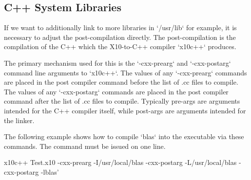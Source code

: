 \subsection{C++ System Libraries}

If we want to additionally link to more libraries in \xcd`/usr/lib` for
example, it is necessary to adjust the post-compilation directly.  The
post-compilation is the compilation of the C++ which the X10-to-C++ compiler
\xcd`x10c++` produces.  

The primary mechanism used for this is the \xcd`-cxx-prearg` and
\xcd`-cxx-postarg` command line arguments to
\xcd`x10c++`. The values of any \xcd`-cxx-prearg` commands are placed
in the post compiler command before the list of .cc files to compile.
The values of any \xcd`-cxx-postarg` commands are placed in the post
compiler command after the list of .cc files to compile. Typically
pre-args are arguments intended for the C++ compiler itself, while
post-args are arguments intended for the linker. 

The following example shows how to compile \xcd`blas` into the
executable via these commands. The command must be issued on one line.

\begin{xten}
x10c++ Test.x10 -cxx-prearg -I/usr/local/blas 
  -cxx-postarg -L/usr/local/blas -cxx-postarg -lblas'
\end{xten}

